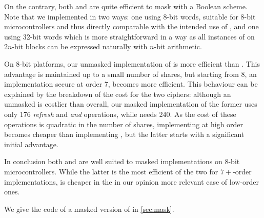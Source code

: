 On the contrary, both \fly and \simon are quite efficient to mask with a Boolean scheme.
Note that we implemented \simonC in two ways: one using 8-bit words, suitable for 8-bit microcontrollers
and thus directly comparable with the intended use of \fly, and one using 32-bit words which is more straightforward in a way as all instances of \simon on $2n$-bit blocks
can be expressed naturally with $n$-bit arithmetic.

On 8-bit platforms, our unmasked implementation of \fly is more efficient than \simonC.
This advantage is maintained up to a small number of shares, but starting from 8, \ie{} an implementation secure at order 7,
\simon becomes more efficient.
This behaviour can be explained by the breakdown of the cost for the two ciphers:
although an unmasked \simonC is costlier than \fly overall,
our masked implementation of the former uses only 176 \emph{refresh} and \emph{and} operations, while \fly needs 240.
As the cost of these operations is quadratic in
the number of shares, implementing \simon at high order becomes cheaper than implementing \fly, but the latter starts with
a significant initial advantage.

In conclusion both \fly and \simon are well suited to masked implementations on 8-bit microcontrollers. While the latter is the most efficient of the
two for $7+$-order implementations, \fly is cheaper in the in our opinion more relevant case of low-order ones.

We give the code of a masked version of \fly in \autoref{sec:mask}.
